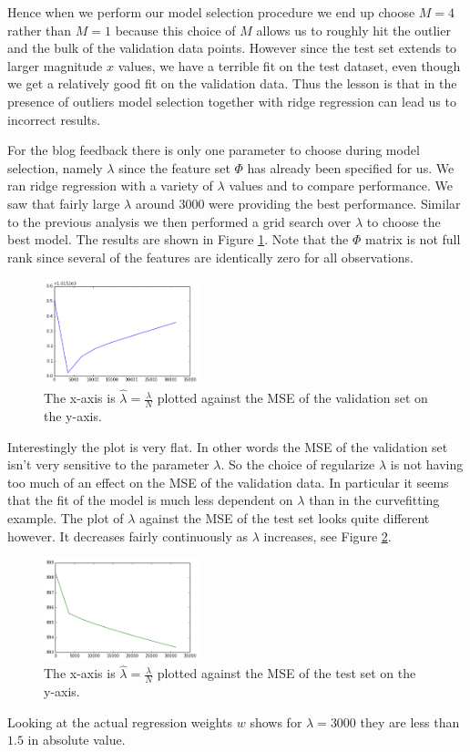 \documentclass[10pt]{article}
\begin{document}
%
%
%
Hence when we perform our model selection procedure we end up choose $M = 4$ rather than $M = 1$ because this choice of $M$ allows us to roughly hit the outlier and the bulk of the validation data points. However since the test set extends to larger magnitude $x$ values, we have a terrible fit on the test dataset, even though we get a relatively good fit on the validation data. Thus the lesson is that in the presence of outliers model selection together with ridge regression can lead us to incorrect results.
%
%

For the blog feedback there is only one parameter to choose during model selection, namely $\lambda$ since the feature set $\Phi$ has already been specified for us. We ran ridge regression with a variety of $\lambda$ values and to compare performance. We saw that fairly large $\lambda$ around $3000$ were providing the best performance. Similar to the previous analysis we then performed a grid search over $\lambda$ to choose the best model. The results are shown in Figure \ref{blog-model-selection}. Note that the $\Phi$ matrix is not full rank since several of the features are identically zero for all observations.
%

%
%
%
\begin{figure}[h]
\centering
\includegraphics[width=0.4\textwidth]{blog-model-selection}
\caption{The x-axis is $\hat{\lambda} = \frac{\lambda}{N}$ plotted against the MSE of the validation set on the y-axis.}
\label{blog-model-selection}
\end{figure}
%
Interestingly the plot is very flat. In other words the MSE of the validation set isn't very sensitive to the parameter $\lambda$.  So the choice of regularize $\lambda$ is not having too much of an effect on the MSE of the validation data. In particular it seems that the fit of the model is much less dependent on $\lambda$ than in the curvefitting example.  The plot of $\lambda$ against the MSE of the test set looks quite different however. It decreases fairly continuously as $\lambda$ increases, see Figure \ref{blog-model-select-test}.
\begin{figure}[h]
\centering
\includegraphics[width=0.4\textwidth]{blog-model-select-test}
\caption{The x-axis is $\hat{\lambda} = \frac{\lambda}{N}$ plotted against the MSE of the test set on the y-axis.}
\label{blog-model-select-test}
\end{figure}
Looking at the actual regression weights $w$ shows for $\lambda = 3000$ they are less than $1.5$ in absolute value.
\end{document}
